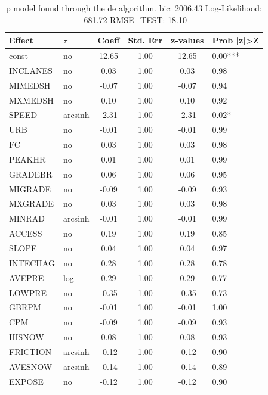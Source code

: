 \begin{table}
	\caption{p model found through the de algorithm. bic: 2006.43 Log-Likelihood: -681.72 RMSE_TEST: 18.10}
	\begin{center}
		\begin{tabular}{|l|l|c|c|c|l|}
			\hline
			Effect & $\tau$ & Coeff & Std. Err & z-values & Prob |z|>Z \\
			\hline
			const & no & 12.65 & 1.00 & 12.65 & 0.00*** \\
			\hline
			INCLANES & no & 0.03 & 1.00 & 0.03 & 0.98 \\
			\hline
			MIMEDSH & no & -0.07 & 1.00 & -0.07 & 0.94 \\
			\hline
			MXMEDSH & no & 0.10 & 1.00 & 0.10 & 0.92 \\
			\hline
			SPEED & arcsinh & -2.31 & 1.00 & -2.31 & 0.02* \\
			\hline
			URB & no & -0.01 & 1.00 & -0.01 & 0.99 \\
			\hline
			FC & no & 0.03 & 1.00 & 0.03 & 0.98 \\
			\hline
			PEAKHR & no & 0.01 & 1.00 & 0.01 & 0.99 \\
			\hline
			GRADEBR & no & 0.06 & 1.00 & 0.06 & 0.95 \\
			\hline
			MIGRADE & no & -0.09 & 1.00 & -0.09 & 0.93 \\
			\hline
			MXGRADE & no & 0.03 & 1.00 & 0.03 & 0.98 \\
			\hline
			MINRAD & arcsinh & -0.01 & 1.00 & -0.01 & 0.99 \\
			\hline
			ACCESS & no & 0.19 & 1.00 & 0.19 & 0.85 \\
			\hline
			SLOPE & no & 0.04 & 1.00 & 0.04 & 0.97 \\
			\hline
			INTECHAG & no & 0.28 & 1.00 & 0.28 & 0.78 \\
			\hline
			AVEPRE & log & 0.29 & 1.00 & 0.29 & 0.77 \\
			\hline
			LOWPRE & no & -0.35 & 1.00 & -0.35 & 0.73 \\
			\hline
			GBRPM & no & -0.01 & 1.00 & -0.01 & 1.00 \\
			\hline
			CPM & no & -0.09 & 1.00 & -0.09 & 0.93 \\
			\hline
			HISNOW & no & 0.08 & 1.00 & 0.08 & 0.93 \\
			\hline
			FRICTION & arcsinh & -0.12 & 1.00 & -0.12 & 0.90 \\
			\hline
			AVESNOW & arcsinh & -0.14 & 1.00 & -0.14 & 0.89 \\
			\hline
			EXPOSE & no & -0.12 & 1.00 & -0.12 & 0.90 \\

\end{tabular}
\end{center}
\end{table}
